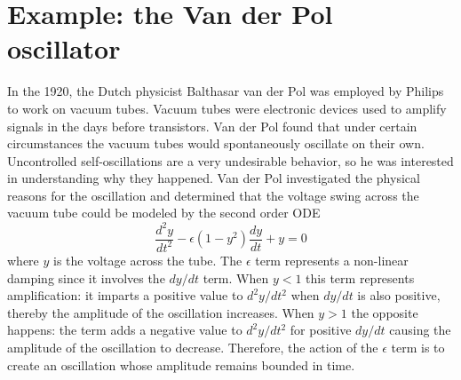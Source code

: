 \documentclass[hidelinks,notitlepage]{book}
\begin{document}
\section{Example: the Van der Pol oscillator}
In the 1920, the Dutch physicist  Balthasar van der Pol was employed by Philips to work on vacuum tubes.  Vacuum tubes were electronic devices used to amplify signals in the days before transistors.  Van der Pol found that under certain circumstances the vacuum tubes would spontaneously oscillate on their own.  Uncontrolled self-oscillations are a very undesirable behavior, so he was interested in understanding why they happened.  Van der Pol investigated the physical reasons for the oscillation and determined that the voltage swing across the vacuum tube could be modeled by the second order ODE 
\begin{equation}
\label{eq:VanDerPolOsc}
\frac{d^2 y}{d t^2} - \epsilon(1 - y^2)\frac{d y}{d t} + y = 0
\end{equation}
where $y$ is the voltage across the tube.  The $\epsilon$ term represents a non-linear damping since it involves the $d y/d t$ term.  When $y < 1$ this term represents amplification: it imparts a positive value to ${d^2 y}/{d t^2}$ when ${d y}/{d t}$ is also positive, thereby the amplitude of the oscillation increases.  When $y > 1$ the opposite happens:  the term adds a negative value to ${d^2 y}/{d t^2}$ for positive ${d y}/{d t}$ causing the amplitude of the oscillation to decrease.   Therefore, the action of the $\epsilon$ term is to create an oscillation whose amplitude remains bounded in time.
\end{document}
